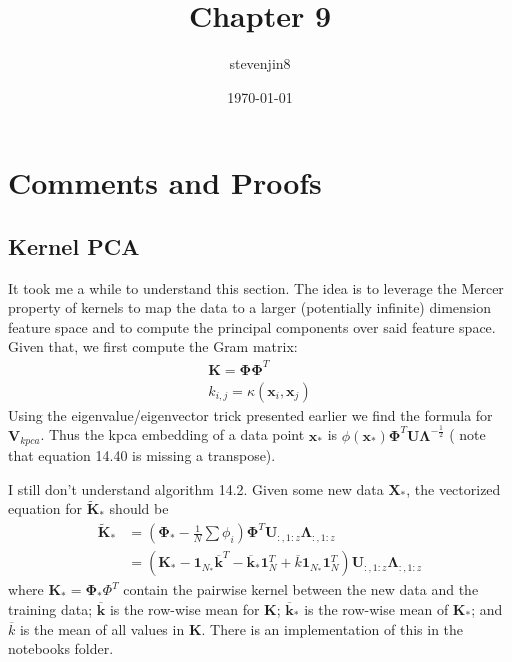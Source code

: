 \documentclass[a4paper,11pt]{article}
\title{Chapter 9}
\author{stevenjin8}
\date{\today}
\begin{document}
  \maketitle

  \section*{Comments and Proofs}
  \setcounter{section}{4}
  \setcounter{subsection}{3}
  \subsection{Kernel PCA}

  It took me a while to understand this section. The idea is to leverage the Mercer property of
  kernels to map the data to a larger (potentially infinite) dimension feature space and to compute
  the principal components over said feature space. Given that, we first compute the Gram matrix:
  \begin{align*}
    \mathbf{K} = \boldsymbol{\Phi}\boldsymbol{\Phi} ^ T \\
    k_{i,j} = \kappa(\mathbf{x}_i, \mathbf{x}_j)
  \end{align*}
  Using the eigenvalue/eigenvector trick presented earlier we find the formula for
  $\mathbf{V}_{kpca}$. Thus the kpca embedding of a data point $\mathbf{x}_*$ is
  $\phi(\mathbf{x_*}) \boldsymbol{\Phi}^T \mathbf{U} \boldsymbol{\Lambda} ^ {-\frac12}$ (
  note that equation 14.40 is missing a transpose).

  I still don't understand algorithm 14.2. Given some new data $\mathbf{X}_*$, the vectorized
  equation for $\tilde{\mathbf{K}}_*$ should
  be
  \begin{align*}
    \tilde{\mathbf{K}}_* &= (\boldsymbol{\Phi}_* - \frac1N\sum \phi_i) \boldsymbol{\Phi}^T
    \mathbf{U}_{:, 1: z} \boldsymbol{\Lambda}_{:, 1:z} \\
    &= (\mathbf{K}_* - \mathbf{1}_{N_*} \overline{\mathbf{k}}^T
    - \overline{\mathbf{k}}_* \mathbf{1}_N^T
    + \overline{k} \mathbf{1}_{N_*} \mathbf{1}_{N}^T)
    \mathbf{U}_{:, 1: z} \boldsymbol{\Lambda}_{:, 1:z}
  \end{align*}
  where $\mathbf{K}_* = \boldsymbol{\Phi}_* \Phi^T$ contain the pairwise kernel between the new data
  and the training data; $\overline{\mathbf{k}}$ is the row-wise mean for $\mathbf{K}$;
  $\overline{\mathbf{k}}_*$ is the row-wise mean of $\mathbf{K}_*$; and $\overline{k}$ is the
  mean of all values in $\mathbf{K}$. There is an implementation of this in the notebooks folder.
\end{document}
